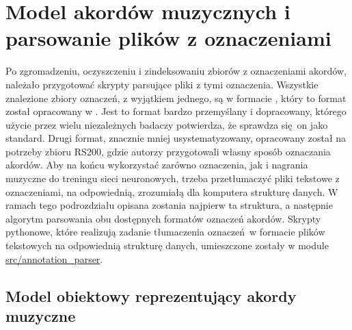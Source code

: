 \section{Model akordów muzycznych i parsowanie plików z oznaczeniami} \label{section:chord_model}

Po zgromadzeniu, oczyszczeniu i zindeksowaniu zbiorów z oznaczeniami akordów, należało przygotować skrypty parsujące pliki z tymi oznaczenia. Wszystkie znalezione zbiory oznaczeń, z wyjątkiem jednego, są w formacie , który to format został opracowany w \cite{harte_towards_nodate}.  Jest to format bardzo przemyślany i dopracowany, którego użycie przez wielu niezależnych badaczy potwierdza, że sprawdza się on jako standard. Drugi format, znacznie mniej usystematyzowany, opracowany został na potrzeby zbioru RS200, gdzie autorzy przygotowali własny sposób oznaczania akordów. Aby na końcu wykorzystać zarówno oznaczenia, jak i nagrania muzyczne do treningu sieci neuronowych, trzeba przetłumaczyć pliki tekstowe z oznaczeniami, na odpowiednią, zrozumiałą dla komputera strukturę danych. W ramach tego podrozdziału opisana zostania najpierw ta struktura, a następnie algorytm parsowania obu dostępnych formatów oznaczeń akordów. Skrypty pythonowe, które realizują zadanie tłumaczenia oznaczeń w formacie plików tekstowych na odpowiednią strukturę danych, umieszczone zostały w module \url{src/annotation_parser}.

\subsection{Model obiektowy reprezentujący akordy muzyczne} \label{subsection:chord_model}

